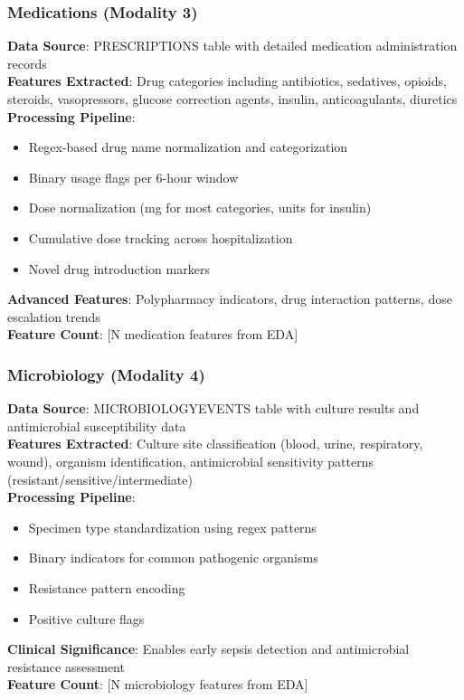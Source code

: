 \documentclass[11pt]{article}
\begin{document}
\subsubsection{Medications (Modality 3)}
\textbf{Data Source}: PRESCRIPTIONS table with detailed medication administration records
\\
\textbf{Features Extracted}: Drug categories including antibiotics, sedatives, opioids, steroids, vasopressors, glucose correction agents, insulin, anticoagulants, diuretics
\\
\textbf{Processing Pipeline}: 
\begin{itemize}
    \item Regex-based drug name normalization and categorization
    \item Binary usage flags per 6-hour window
    \item Dose normalization (mg for most categories, units for insulin)
    \item Cumulative dose tracking across hospitalization
    \item Novel drug introduction markers
\end{itemize}
\textbf{Advanced Features}: Polypharmacy indicators, drug interaction patterns, dose escalation trends
\\
\textbf{Feature Count}: [N medication features from EDA]

\subsubsection{Microbiology (Modality 4)}
\textbf{Data Source}: MICROBIOLOGYEVENTS table with culture results and antimicrobial susceptibility data
\\
\textbf{Features Extracted}: Culture site classification (blood, urine, respiratory, wound), organism identification, antimicrobial sensitivity patterns (resistant/sensitive/intermediate)
\\
\textbf{Processing Pipeline}:
\begin{itemize}
    \item Specimen type standardization using regex patterns
    \item Binary indicators for common pathogenic organisms
    \item Resistance pattern encoding
    \item Positive culture flags
\end{itemize}
\textbf{Clinical Significance}: Enables early sepsis detection and antimicrobial resistance assessment
\\
\textbf{Feature Count}: [N microbiology features from EDA]
\end{document}
